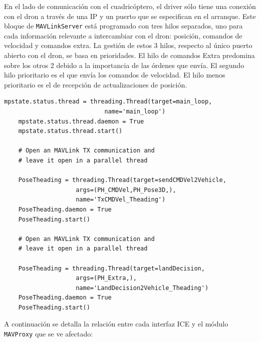 En el lado de comunicación con el cuadricóptero, el driver sólo tiene una conexión con el dron a través de una IP y un puerto que se especifican en el arranque. Este bloque de \texttt{MAVLinkServer} está programado con tres hilos separados, uno para cada información relevante a intercambiar con el dron: posición, comandos de velocidad y comandos extra. La gestión de estos 3 hilos, respecto al único puerto abierto con el dron, se basa en prioridades. El hilo de comandos Extra predomina sobre los otros 2 debido a la importancia de las órdenes que envía. El segundo hilo prioritario es el que envía los comandos de velocidad. El hilo menos prioritario es el de recepción de actualizaciones de posición. 

\begin{lstlisting}[frame=single]
    mpstate.status.thread = threading.Thread(target=main_loop, 
    						name='main_loop')
    mpstate.status.thread.daemon = True
    mpstate.status.thread.start()

    # Open an MAVLink TX communication and 
    # leave it open in a parallel thread
  
    PoseTheading = threading.Thread(target=sendCMDVel2Vehicle, 
    				args=(PH_CMDVel,PH_Pose3D,), 
                    name='TxCMDVel_Theading')
    PoseTheading.daemon = True
    PoseTheading.start()

    # Open an MAVLink TX communication and 
    # leave it open in a parallel thread

    PoseTheading = threading.Thread(target=landDecision, 
    				args=(PH_Extra,), 
                    name='LandDecision2Vehicle_Theading')
    PoseTheading.daemon = True
    PoseTheading.start()   
\end{lstlisting}

 A continuación se detalla la relación entre cada interfaz ICE y el módulo \texttt{MAVProxy} que se ve afectado:

